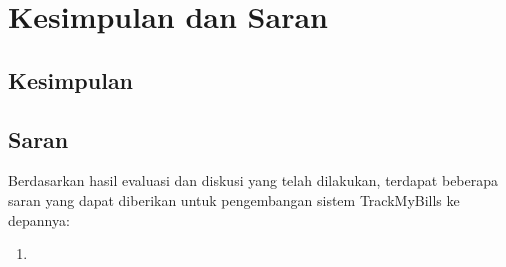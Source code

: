 \chapter{Kesimpulan dan Saran}

\section{Kesimpulan}
\label{sec:kesimpulan}

\section{Saran}
\label{sec:saran}
Berdasarkan hasil evaluasi dan diskusi yang telah dilakukan, terdapat beberapa saran yang dapat diberikan untuk pengembangan sistem TrackMyBills ke depannya:
\begin{enumerate}
    \item 
\end{enumerate}